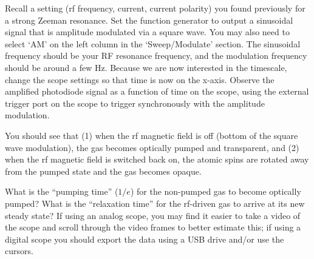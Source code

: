 \documentclass{../lab}
\begin{document}
Recall a setting (rf frequency, current, current polarity) you found previously for a strong Zeeman resonance.  Set the function generator to output a sinusoidal signal that is amplitude modulated via a square wave. You may also need to select `AM' on the left column in the `Sweep/Modulate' section. The sinusoidal frequency should be your RF resonance frequency, and the modulation frequency should be around a few Hz. Because we are now interested in the timescale, change the scope settings so that time is now on the x-axis. Observe the amplified photodiode signal as a function of time on the scope, using the external trigger port on the scope to trigger synchronously with the amplitude modulation.

You should see that (1) when the rf magnetic field is off (bottom of the square wave modulation), the gas becomes optically pumped and transparent, and (2) when the rf magnetic field is switched back on, the atomic spins are rotated away from the pumped state and the gas becomes opaque.

What is the ``pumping time'' ($1/e$) for the non-pumped gas to become optically pumped?  What is the ``relaxation time'' for the rf-driven gas to arrive at its new steady state? If using an analog scope, you may find it easier to take a video of the scope and scroll through the video frames to better estimate this; if using a digital scope you should export the data using a USB drive and/or use the cursors.




\end{document}
